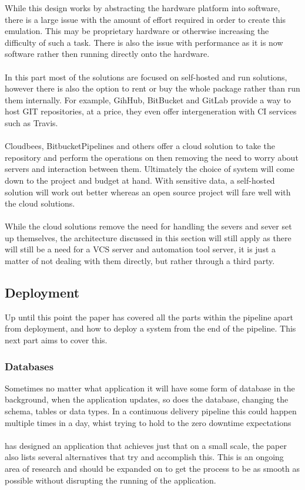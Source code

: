 While this design works by abstracting the hardware platform into software, there is a large issue with the amount of effort required in order to create this emulation. This may be proprietary hardware or otherwise increasing the difficulty of such a task. There is also the issue with performance as it is now software rather then running directly onto the hardware. 
\\\\
In this part most of the solutions are focused on self-hosted and run solutions, however there is also the option to rent or buy the whole package rather than run them internally. For example, GihHub, BitBucket and GitLab provide a way to host GIT repositories, at a price, they even offer intergeneration with CI services such as Travis. 
\\\\
Cloudbees, BitbucketPipelines and others offer a cloud solution to take the repository and perform the operations on then removing the need to worry about servers and interaction between them. Ultimately the choice of system will come down to the project and budget at hand. With sensitive data, a self-hosted solution will work out better whereas an open source project will fare well with the cloud solutions.
\\\\
While the cloud solutions remove the need for handling the severs and sever set up themselves, the architecture discussed in this section will still apply as there will still be a need for a VCS server and automation tool server, it is just a matter of not dealing with them directly, but rather through a third party.

\subsection{Deployment}
\label{sec:deployment}

Up until this point the paper has covered all the parts within the pipeline apart from deployment, and how to deploy a system from the end of the pipeline. This next part aims to cover this.

\subsubsection{Databases}
Sometimes no matter what application it will have some form of database in the background, when the application updates, so does the database, changing the schema, tables or data types. In a continuous delivery pipeline this could happen multiple times in a day, whist trying to hold to the zero downtime expectations
\\\\
\cite{updatedatabse} has designed an application that achieves just that on a small scale, the paper also lists several alternatives that try and accomplish this. This is an ongoing area of research and should be expanded on to get the process to be as smooth as possible without disrupting the running of the application.  

